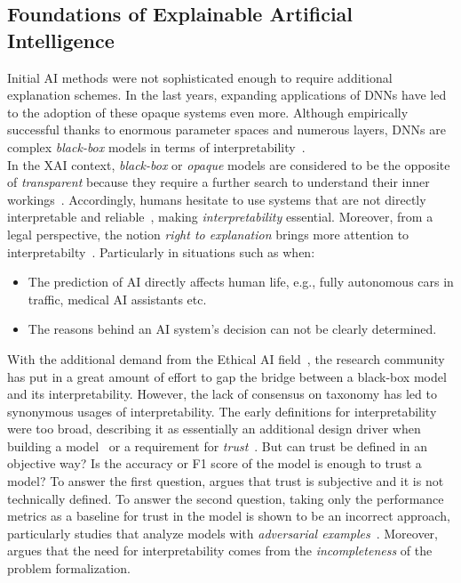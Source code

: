 \subsection{Foundations of Explainable Artificial Intelligence}
\label{subsec:xai_foundations}
Initial AI methods were not sophisticated enough to require additional explanation schemes. In the last years, expanding applications of DNNs have led to the adoption of these opaque systems even more. Although empirically successful thanks to enormous parameter spaces and numerous layers, DNNs are complex \emph{black-box} models in terms of  interpretability~\parencite{CanWeOpenTheBlackBoxOfAI_Castelvecchi}.\\
In the XAI context, \emph{black-box} or \emph{opaque} models are considered to be the opposite of \emph{transparent} because they require a further search to understand their inner workings~\parencite{TheMythosOfModelInterpretability_Lipton}. Accordingly, humans hesitate to use
systems that are not directly interpretable and reliable~\parencite{xAIForDesigners_Zhu}, making \emph{interpretability} essential. Moreover, from a legal perspective, the notion \emph{right to explanation} brings more attention to interpretabilty~\parencite{TheMythosOfModelInterpretability_Lipton}. Particularly in situations such as when:
\begin{itemize}
    \item The prediction of AI directly affects human life, e.g., fully autonomous cars in traffic, medical AI assistants etc.
    \item The reasons behind an AI system’s decision can not be clearly determined.
\end{itemize}
With the additional demand from the Ethical AI field~\parencite{EURegulationsOnDecisionMaking_Goodman}, the research community has put in a great amount of effort to gap the bridge between a black-box model and its interpretability. However, the lack of consensus on taxonomy has led to synonymous usages of interpretability. The early definitions for interpretability were too broad, describing it as essentially an additional design driver when building a model~\parencite{TheBayesianCaseModel_Kim} or a requirement for \emph{trust}~\parencite{InteractiveAndInterpretableMLModels_Kim}. But can trust be defined in an objective way? Is the accuracy or F1 score of the model is enough to trust a model? To answer the first question, \cite{TheMythosOfModelInterpretability_Lipton} argues that trust is subjective and it is not technically defined. To answer the second question, taking only the performance metrics as a baseline for trust in the model is shown to be an incorrect approach, particularly studies that analyze models with \emph{adversarial examples}~\parencite{DetectingAdversarilaImageExamples_Bin, AdversarialExamples_Yuan}. Moreover, ~\cite{TowardsARigorousScienceML_Velez} argues that the need for interpretability comes from the \emph{incompleteness} of the problem formalization.\\
